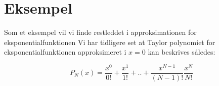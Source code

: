 
\section{Eksempel}
Som et eksempel vil vi finde restleddet i approksimationen for eksponentialfunktionen
Vi har tidligere set at Taylor polynomiet for eksponentialfunktionen approksimeret i $x=0$ kan beskrives således:

\[
P_N(x)=\frac{x^{0}}{0!}+\frac{x^{1}}{1!}+..+\frac{x^{N-1}}{(N-1)!}\frac{x^{N}}{N!}
\]



